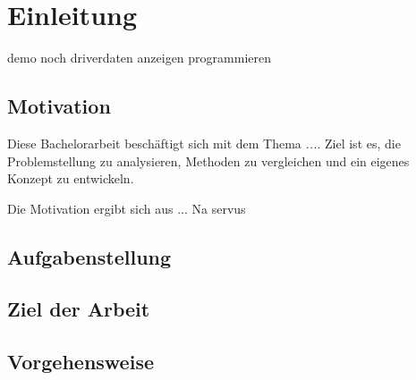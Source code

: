 \chapter{Einleitung}
demo noch driverdaten anzeigen programmieren
\section{Motivation}
Diese Bachelorarbeit beschäftigt sich mit dem Thema \emph{...}.
Ziel ist es, die Problemstellung zu analysieren, Methoden zu vergleichen
und ein eigenes Konzept zu entwickeln.

Die Motivation ergibt sich aus ...
Na servus

\section{Aufgabenstellung}
\section{Ziel der Arbeit}
\section{Vorgehensweise}